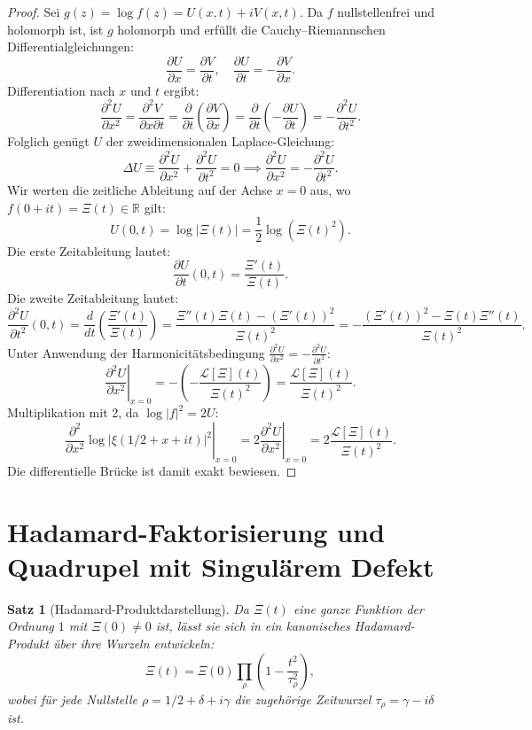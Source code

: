 \documentclass[11pt,a4paper]{article}
\newtheorem{theorem}{Satz}[section]
\theoremstyle{definition}
\theoremstyle{remark}
\begin{document}
\begin{proof}
Sei $g(z) = \log f(z) = U(x, t) + i V(x, t)$. Da $f$ nullstellenfrei und holomorph ist, ist $g$ holomorph und erfüllt die Cauchy--Riemannschen Differentialgleichungen:
\[
\frac{\partial U}{\partial x} = \frac{\partial V}{\partial t}, \quad \frac{\partial U}{\partial t} = -\frac{\partial V}{\partial x}.
\]
Differentiation nach $x$ und $t$ ergibt:
\[
\frac{\partial^2 U}{\partial x^2} = \frac{\partial^2 V}{\partial x \partial t} = \frac{\partial}{\partial t}\left(\frac{\partial V}{\partial x}\right) = \frac{\partial}{\partial t}\left(-\frac{\partial U}{\partial t}\right) = -\frac{\partial^2 U}{\partial t^2}.
\]
Folglich genügt $U$ der zweidimensionalen Laplace-Gleichung:
\[
\Delta U \equiv \frac{\partial^2 U}{\partial x^2} + \frac{\partial^2 U}{\partial t^2} = 0 \implies \frac{\partial^2 U}{\partial x^2} = -\frac{\partial^2 U}{\partial t^2}.
\]
Wir werten die zeitliche Ableitung auf der Achse $x = 0$ aus, wo $f(0+it) = \Xi(t) \in \mathbb{R}$ gilt:
\[
U(0, t) = \log |\Xi(t)| = \frac{1}{2}\log (\Xi(t)^2).
\]
Die erste Zeitableitung lautet:
\[
\frac{\partial U}{\partial t}(0, t) = \frac{\Xi'(t)}{\Xi(t)}.
\]
Die zweite Zeitableitung lautet:
\[
\frac{\partial^2 U}{\partial t^2}(0, t) = \frac{d}{dt}\left(\frac{\Xi'(t)}{\Xi(t)}\right) = \frac{\Xi''(t)\Xi(t) - (\Xi'(t))^2}{\Xi(t)^2} = -\frac{(\Xi'(t))^2 - \Xi(t)\Xi''(t)}{\Xi(t)^2}.
\]
Unter Anwendung der Harmonicitätsbedingung $\frac{\partial^2 U}{\partial x^2} = -\frac{\partial^2 U}{\partial t^2}$:
\[
\left.\frac{\partial^2 U}{\partial x^2}\right|_{x=0} = -\left(-\frac{\mathcal{L}[\Xi](t)}{\Xi(t)^2}\right) = \frac{\mathcal{L}[\Xi](t)}{\Xi(t)^2}.
\]
Multiplikation mit 2, da $\log |f|^2 = 2U$:
\[
\left.\frac{\partial^2}{\partial x^2}\log |\xi(1/2 + x + it)|^2\right|_{x=0} = 2 \left.\frac{\partial^2 U}{\partial x^2}\right|_{x=0} = 2 \frac{\mathcal{L}[\Xi](t)}{\Xi(t)^2}.
\]
Die differentielle Brücke ist damit exakt bewiesen.
\end{proof}

\section{Hadamard-Faktorisierung und Quadrupel mit Singulärem Defekt}

\begin{theorem}[Hadamard-Produktdarstellung]
Da $\Xi(t)$ eine ganze Funktion der Ordnung $1$ mit $\Xi(0) \neq 0$ ist, lässt sie sich in ein kanonisches Hadamard-Produkt über ihre Wurzeln entwickeln:
\begin{equation}
\Xi(t) = \Xi(0) \prod_{\rho} \left(1 - \frac{t^2}{\tau_\rho^2}\right),
\end{equation}
wobei für jede Nullstelle $\rho = 1/2 + \delta + i\gamma$ die zugehörige Zeitwurzel $\tau_\rho = \gamma - i\delta$ ist.
\end{theorem}
\end{document}
